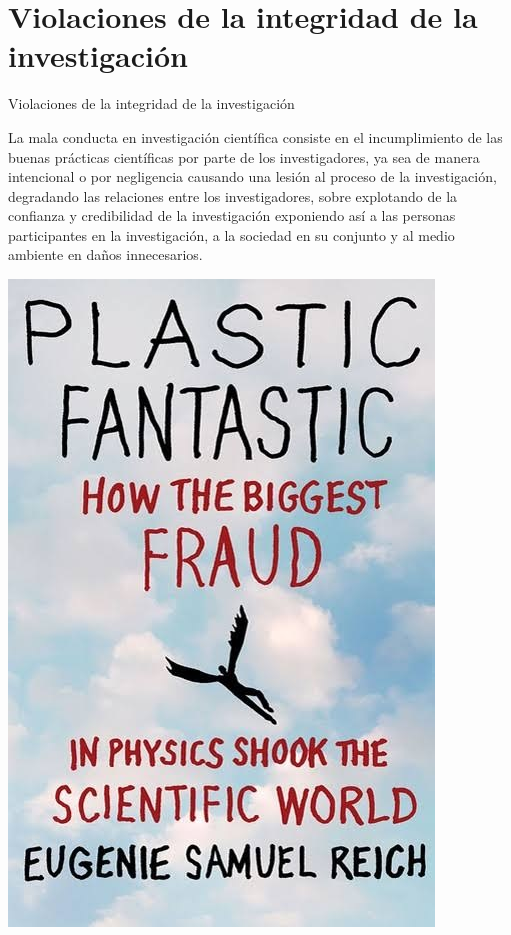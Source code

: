 \section{Violaciones de la integridad de la investigación}
\begin{frame}{Violaciones de la integridad de la investigación}
    \begin{minipage}{0.7\linewidth}
        La mala conducta en investigación científica consiste en el incumplimiento de las buenas prácticas
científicas por parte de los investigadores, ya sea de manera intencional o por negligencia causando 
una lesión al proceso de la investigación,  degradando las relaciones entre los investigadores, sobre explotando de la confianza
y credibilidad de la investigación exponiendo así a las personas participantes en la investigación, a la sociedad en su conjunto y al medio 
ambiente en daños innecesarios.
    \end{minipage}
    \begin{minipage}{0.25\linewidth}
        \centering
        \includegraphics[scale=0.35]{images/ima11.jpg}
    \end{minipage}
\end{frame}

